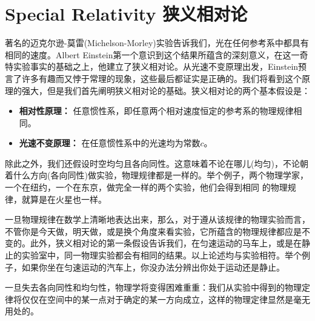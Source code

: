 




\chapter[狭义相对论]{Special Relativity 狭义相对论}
\label{chap2}
 著名的迈克尔逊-莫雷(Michelson-Morley)实验告诉我们，光在任何参考系中都具有相同的速度。Albert Einstein第一个意识到这个结果所蕴含的深刻意义，在这一奇特实验事实的基础之上，他建立了狭义相对论。从光速不变原理出发，Einstein预言了许多有趣而又悖于常理的现象，这些最后都证实是正确的。我们将看到这个原理的强大，但是我们首先阐明狭义相对论的基础。狭义相对论的两个基本假设是：
 \begin{itemize}
   \item {\bf{相对性原理：}} 任意惯性系，即任意两个相对速度恒定的参考系的物理规律相同。
   \item {\bf{光速不变原理：}} 在任意惯性系中的光速均为常数$c$。
 \end{itemize}
除此之外，我们还假设时空均匀且各向同性。这意味着不论在哪儿(均匀)，不论朝着什么方向(各向同性)做实验，物理规律都是一样的。举个例子，两个物理学家，一个在纽约，一个在东京，做完全一样的两个实验，他们会得到相同
  的物理规律，就算是在火星也一样。

一旦物理规律在数学上清晰地表达出来，那么，对于遵从该规律的物理实验而言，不管你是今天做，明天做，或是换个角度来看实验，它所蕴含的物理规律都应是不变的。此外，狭义相对论的第一条假设告诉我们，在匀速运动的马车上，或是在静止的实验室中，同一物理实验都会有相同的结果。以上论述均与实验相符。举个例子，如果你坐在匀速运动的汽车上，你没办法分辨出你处于运动还是静止。

一旦失去各向同性和均匀性，物理学将变得困难重重：我们从实验中得到的物理定律将仅仅在空间中的某一点对于确定的某一方向成立，这样的物理定律显然是毫无用处的。

